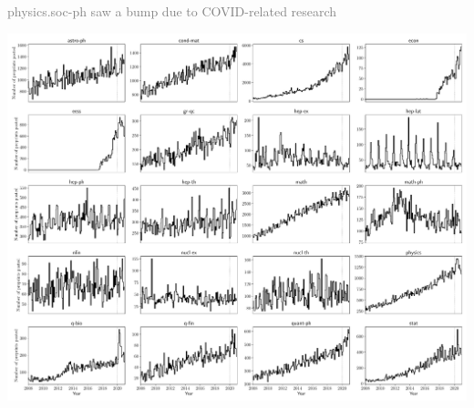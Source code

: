 \documentclass{nature}
\makeatletter
\renewenvironment*{figure}{\@float{figure}}{\end@float}
\newcommand{\todo}[1]{\textcolor{gray}{#1}}
\makeatother
\begin{document}
\noindent\todo{physics.soc-ph saw a bump due to COVID-related research}


 \begin{figure}
     \includegraphics[width=\textwidth]{pre-prints-segmented-by-field}
     \caption{Most fields saw no change in the number of pre-prints posted due to the COVID-19 pandemic. The number of pre-prints continued to increase each year in most fields. \todo{The model.} The exception is quantitative biology (q-bio), where the spike in 2020 is in part caused by COVID-19 related pre-prints authored by people who are non-established biologists.}
     \label{fig:pre-prints-segmented-by-field}
 \end{figure}
 
\end{document}
